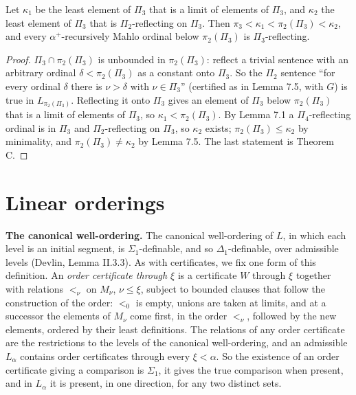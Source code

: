 \documentclass[11pt]{article}
\begin{document}
\begin{statement} Let $\kappa_1$ be the least element of $\Pi_3$ that is a limit of elements of $\Pi_3$,
and $\kappa_2$ the least element of $\Pi_3$ that is $\Pi_2$-reflecting on $\Pi_3$. Then $\pi_3 < \kappa_1 < \pi_2(\Pi_3) < \kappa_2$,
and every $\alpha^+$-recursively Mahlo ordinal below $\pi_2(\Pi_3)$ is $\Pi_3$-reflecting.
\end{statement}

\begin{proof}
$\Pi_3 \cap \pi_2(\Pi_3)$ is unbounded in $\pi_2(\Pi_3)$: reflect a trivial sentence with an arbitrary ordinal $\delta < \pi_2(\Pi_3)$
as a constant onto $\Pi_3$. So the $\Pi_2$ sentence ``for every ordinal $\delta$ there is $\nu > \delta$ with
$\nu \in \Pi_3$'' (certified as in Lemma 7.5, with $G$) is true in $L_{\pi_2(\Pi_3)}$. Reflecting it onto $\Pi_3$ gives an element
of $\Pi_3$ below $\pi_2(\Pi_3)$ that is a limit of elements of $\Pi_3$, so $\kappa_1 < \pi_2(\Pi_3)$. By Lemma 7.1 a
$\Pi_4$-reflecting ordinal is in $\Pi_3$ and $\Pi_2$-reflecting on $\Pi_3$, so $\kappa_2$ exists; $\pi_2(\Pi_3) \le \kappa_2$ by
minimality, and $\pi_2(\Pi_3) \ne \kappa_2$ by Lemma 7.5. The last statement is Theorem C.
\end{proof}

\section{Linear orderings}

\textbf{The canonical well-ordering.} The canonical well-ordering of $L$, in which each level is an initial segment,
is $\Sigma_1$-definable, and so $\Delta_1$-definable, over admissible levels (Devlin, Lemma II.3.3). As
with certificates, we fix one form of this definition. An \emph{order certificate through $\xi$} is a certificate $W$
through $\xi$ together with relations $<_\nu$ on $M_\nu$, $\nu \le \xi$, subject to bounded clauses that follow the
construction of the order: $<_0$ is empty, unions are taken at limits, and at a successor the elements of $M_\nu$
come first, in the order $<_\nu$, followed by the new elements, ordered by their least definitions. The relations of
any order certificate are the restrictions to the levels of the canonical well-ordering, and an admissible
$L_{\alpha}$ contains order certificates through every $\xi < \alpha$. So the existence of an order certificate giving
a comparison is $\Sigma_1$, it gives the true comparison when present, and in $L_{\alpha}$ it is present, in one
direction, for any two distinct sets.
\end{document}
